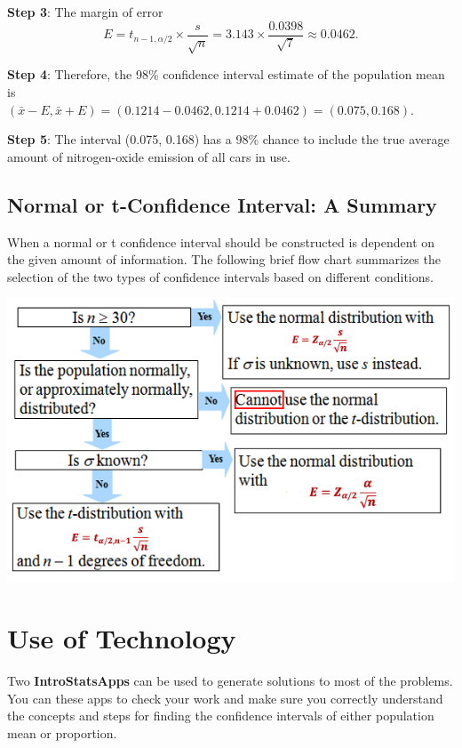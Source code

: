 \documentclass[
]{book}
\begin{document}
\textbf{Step 3}: The margin of error
\[
E = t_{n-1, \alpha/2} \times \frac{s}{\sqrt{n}} = 3.143\times\frac{0.0398}{\sqrt{7}} \approx 0.0462.
\]

\textbf{Step 4}: Therefore, the 98\% confidence interval estimate of the population mean is\\
\((\bar{x} - E, \bar{x} + E)= (0.1214-0.0462, 0.1214+0.0462) = (0.075, 0.168)\).

\textbf{Step 5}: The interval (0.075, 0.168) has a 98\% chance to include the true average amount of nitrogen-oxide emission of all cars in use.

\hypertarget{normal-or-t-confidence-interval-a-summary}{%
\subsection{Normal or t-Confidence Interval: A Summary}\label{normal-or-t-confidence-interval-a-summary}}

When a normal or t confidence interval should be constructed is dependent on the given amount of information. The following brief flow chart summarizes the selection of the two types of confidence intervals based on different conditions.

\begin{center}\includegraphics[width=0.6\linewidth]{week07/normalOrT} \end{center}

\hfill\break

\hypertarget{use-of-technology-5}{%
\section{Use of Technology}\label{use-of-technology-5}}

Two \textbf{IntroStatsApps} can be used to generate solutions to most of the problems. You can these apps to check your work and make sure you correctly understand the concepts and steps for finding the confidence intervals of either population mean or proportion.
\end{document}
